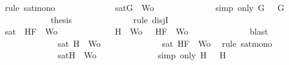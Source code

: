 \begin{isabellebody}
\ {\isacharparenleft}rule\ sat{\isacharunderscore}mono{\isacharparenright}\isanewline
\ \ \ \ \ \ \ \ \ \ \isamarkupfalse%
\ \isamarkupfalse%
\ {\isachardoublequoteopen}sat{\isacharparenleft}{\isacharbraceleft}G{\isacharbraceright}\ {\isasymunion}\ Wo{\isacharparenright}{\isachardoublequoteclose}\isanewline
\ \ \ \ \ \ \ \ \ \ \ \ \isamarkupfalse%
\ {\isacharparenleft}simp\ only{\isacharcolon}\ {\isacartoucheopen}G\ {\isacharequal}\ \isactrlbold {\isasymnot}\ G{}{\isacartoucheclose}{\isacharparenright}\isanewline
\ \ \ \ \ \ \ \ \ \ \isamarkupfalse%
\ {\isacharquery}thesis\isanewline
\ \ \ \ \ \ \ \ \ \ \ \ \isamarkupfalse%
\ {\isacharparenleft}rule\ disjI{}{\isacharparenright}\isanewline
\ \ \ \ \ \ \ \ \isamarkupfalse%
\isanewline
\ \ \ \ \ \ \ \ \ \ \isamarkupfalse%
\ {\isachardoublequoteopen}sat\ {\isacharparenleft}{\isacharbraceleft}\isactrlbold {\isasymnot}\ H{}{\isacharcomma}F{\isacharbraceright}\ {\isasymunion}\ Wo{\isacharparenright}{\isachardoublequoteclose}\isanewline
\ \ \ \ \ \ \ \ \ \ \isamarkupfalse%
\ {\isachardoublequoteopen}{\isacharbraceleft}\isactrlbold {\isasymnot}\ H{}{\isacharbraceright}\ {\isasymunion}\ Wo\ {\isasymsubseteq}\ {\isacharbraceleft}\isactrlbold {\isasymnot}\ H{}{\isacharcomma}F{\isacharbraceright}\ {\isasymunion}\ Wo{\isachardoublequoteclose}\isanewline
\ \ \ \ \ \ \ \ \ \ \ \ \isamarkupfalse%
\ blast\isanewline
\ \ \ \ \ \ \ \ \ \ \isamarkupfalse%
\ \isamarkupfalse%
\ {\isachardoublequoteopen}sat{\isacharparenleft}{\isacharbraceleft}\isactrlbold {\isasymnot}\ H{}{\isacharbraceright}\ {\isasymunion}\ Wo{\isacharparenright}{\isachardoublequoteclose}\isanewline
\ \ \ \ \ \ \ \ \ \ \ \ \isamarkupfalse%
\ {\isacartoucheopen}sat{\isacharparenleft}{\isacharbraceleft}\isactrlbold {\isasymnot}\ H{}{\isacharcomma}F{\isacharbraceright}\ {\isasymunion}\ Wo{\isacharparenright}{\isacartoucheclose}\ \isamarkupfalse%
\ {\isacharparenleft}rule\ sat{\isacharunderscore}mono{\isacharparenright}\isanewline
\ \ \ \ \ \ \ \ \ \ \isamarkupfalse%
\ \isamarkupfalse%
\ {\isachardoublequoteopen}sat{\isacharparenleft}{\isacharbraceleft}H{\isacharbraceright}\ {\isasymunion}\ Wo{\isacharparenright}{\isachardoublequoteclose}\isanewline
\ \ \ \ \ \ \ \ \ \ \ \ \isamarkupfalse%
\ {\isacharparenleft}simp\ only{\isacharcolon}\ {\isacartoucheopen}H\ {\isacharequal}\ \isactrlbold {\isasymnot}\ H{}{\isacartoucheclose}{\isacharparenright}\isanewline

\end{isabellebody}
